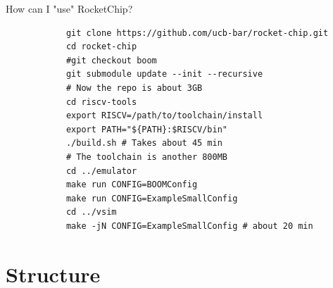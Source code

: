 \documentclass[]{beamer} %
\begin{document}
\begin{frame}[fragile]{How can I "use" RocketChip?}
	\begin{minipage}[c][.4\textheight][c]{\linewidth}
		\begin{verbatim}
			git clone https://github.com/ucb-bar/rocket-chip.git
			cd rocket-chip
			#git checkout boom
			git submodule update --init --recursive
			# Now the repo is about 3GB
			cd riscv-tools
			export RISCV=/path/to/toolchain/install
			export PATH="${PATH}:$RISCV/bin"
			./build.sh # Takes about 45 min
			# The toolchain is another 800MB
			cd ../emulator
			make run CONFIG=BOOMConfig
			make run CONFIG=ExampleSmallConfig
			cd ../vsim
			make -jN CONFIG=ExampleSmallConfig # about 20 min
		\end{verbatim}
	\end{minipage}
\end{frame}



\section{Structure}
\end{document}
